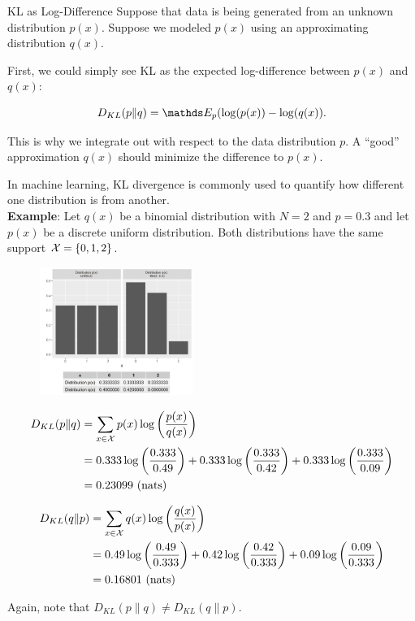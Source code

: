 \documentclass[11pt,compress,t,notes=noshow, xcolor=table]{beamer}
\begin{document}
\begin{vbframe} {KL as Log-Difference}
Suppose that data is being generated from an unknown distribution $p(x)$. 
Suppose we modeled $p(x)$ using an approximating distribution $q(x)$. 

\lz

First, we could simply see KL as the expected log-difference between $p(x)$ and $q(x)$:

  $$ D_{KL}(p \| q) = \E_p(\log(p(x)) - \log(q(x)).$$

This is why we integrate out with respect to the data distribution $p$.
A \enquote{good} approximation $q(x)$ should minimize the difference to $p(x)$.

\framebreak

In machine learning, KL divergence is commonly used to quantify how different one distribution is from another.\\
\lz
\textbf{Example}:
Let $q(x)$ be a binomial distribution with $N = 2$ and $p = 0.3$ and let $p(x)$ be a discrete uniform distribution. Both distributions have the same support $\mathcal{X} = \{0, 1, 2\}$.

\begin{figure}
\includegraphics[width = 5cm ]{figure/kl_log_diff_plot.png} 
\end{figure}

\framebreak

\begin{equation*}
  \begin{split}
 D_{KL}(p \| q) &= \sum_{x \in \mathcal{X}} p(x) \log \left( \frac{p(x)}{q(x)} \right)
 \\ &= 0.333 \log \left( \frac{0.333}{0.49} \right) + 0.333 \log \left( \frac{0.333}{0.42} \right) + 0.333 \log \left( \frac{0.333}{0.09} \right) \\ &= 0.23099 \text{    (nats)}
  \end{split}
\end{equation*}

\begin{equation*}
  \begin{split}
 D_{KL}(q \| p) &= \sum_{x \in \mathcal{X}} q(x) \log \left( \frac{q(x)}{p(x)} \right)
 \\ &= 0.49 \log \left( \frac{0.49}{0.333} \right) + 0.42 \log \left( \frac{0.42}{0.333} \right) + 0.09 \log \left( \frac{0.09}{0.333} \right) \\ &= 0.16801 \text{    (nats)}
  \end{split}
\end{equation*}

Again, note that $D_{KL}(p \| q) \neq D_{KL}(q \| p)$.
\end{vbframe}
\end{document}
